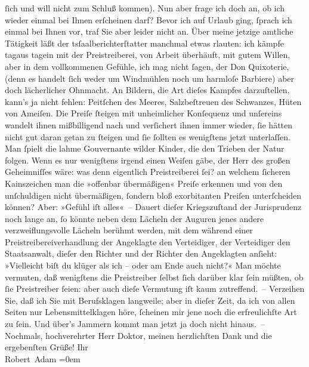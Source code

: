\begin{ledgroupsized}[t]{13cm}
               ſich und will nicht zum Schluß kommen). Nun aber frage ich doch an, ob ich wieder
               einmal bei Ihnen erſcheinen darf? Bevor ich auf Urlaub ging, ſprach ich einmal bei
               Ihnen vor, traf Sie aber leider nicht an.\pend
           \pstart
           Über meine jetzige amtliche Tätigkeit läßt der tsſaalberichterſtatter manchmal etwas rlauten: ich kämpfe tagaus tagein mit der Preistreiberei, von Arbeit
               überhäuft, mit gutem Willen, aber in dem vollkommenen Gefühle, ich mag nicht ſagen,
               der Don Quixoterie,  (denn es handelt ſich weder um Windmühlen noch um
               harmloſe Barbiere) aber doch lächerlicher Ohnmacht. An Bildern, die Art dieſes
               Kampfes darzuſtellen, kann’s ja nicht fehlen: Peitſchen des Meeres, Salzbeſtreuen des
               Schwanzes, Hüten von Ameiſen. Die Preiſe ſteigen mit unheimlicher Konſequenz und
               unſereins wandelt ihnen mißbilligend nach {\pb}und
               verſichert ihnen immer wieder, ſie hätten nicht gut daran getan zu ſteigen und ſie
               ſollten es wenigſtens jetzt unterlaſſen. Man ſpielt die lahme Gouvernante wilder
               Kinder, die den Trieben der Natur folgen. Wenn es nur wenigſtens irgend einen Weiſen
               gäbe, der Herr des großen Geheimniſſes wäre: was denn eigentlich Preistreiberei ſei?
               an welchem ſicheren Kainszeichen man die »offenbar übermäßigen« Preiſe erkennen und
               von den unſchuldigen nicht übermäßigen, ſondern bloß exorbitanten Preiſen
               unterſcheiden können? Aber: »Gefühl iſt alles« –\pend
           \pstart
           Dauert dieſer Kriegszuſtand der Jurisprudenz noch lange an, ſo könnte neben dem
               Lächeln der Auguren jenes andere verzweiflungsvolle Lächeln berühmt werden, mit dem
               während einer Preistreibereiverhandlung der Angeklagte den Verteidiger, der
               Verteidiger den Staatsanwalt, dieſer den Richter und der Richter den Angeklagten
               anſieht: »Vielleicht biſt du {\pb}klüger als ich – oder am
               Ende auch nicht?« Man möchte vermuten, daß wenigſtens die Preistreiber \introOben{}\introOben{}{ }ſelbst \introOben{}ſich\introOben{} darüber klar
               ſein müßten, ob ſie Preistreiber ſeien: aber auch dieſe Vermutung iſt  kaum zutreffend. –\pend
           \pstart
           Verzeihen Sie, daß ich Sie mit Berufsklagen langweile; aber in dieſer Zeit, da ich
               von allen Seiten nur Lebensmittelklagen höre, ſcheinen mir jene noch die
               erfreulichſte Art zu ſein. Und über’s Jammern kommt man jetzt ja doch nicht
               hinaus. –\pend
           \pstart
           Nochmals, hochverehrter Herr Doktor, meinen herzlichſten Dank und die ergebenſten
               Grüße!\pend
           \pstart
           Ihr{\\[\baselineskip]}\spacefill\mbox{Robert Adam}\pend
           \leftskip=0em{}
         

\end{ledgroupsized}

